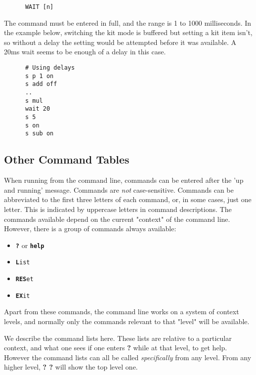    \begin{verbatim}
      WAIT [n]
   \end{verbatim}

   The command must be entered in full, and the range is 1 to 1000 milliseconds.
   In the example below, switching the kit mode is buffered but setting a kit
   item isn't, so without a delay the setting would be attempted before it was
   available. A 20ms wait seems to be enough of a delay in this case.
   \begin{verbatim}
      # Using delays
      s p 1 on
      s add off
      ..
      s mul
      wait 20
      s 5
      s on
      s sub on
   \end{verbatim}

\subsection{Other Command Tables}
\label{subsec:command_line_other_command_tables}

   When running from the command line, commands can be entered after the
   'up and running' message. Commands are \textsl{not} case-sensitive.
   Commands can be abbreviated to the first three letters of each command,
   or, in some cases, just one letter.  This is indicated by
   uppercase letters in command descriptions.
   The commands available depend on the current "context" of the command line.
   However, there is a group of commands always available:

   \begin{itemize}
      \item \texttt{\textbf{?}} or \texttt{\textbf{help}}
      \item \texttt{\textbf{L}ist}
      \item \texttt{\textbf{RES}et}
      \item \texttt{\textbf{EX}it}
   \end{itemize}

   Apart from these commands, the command line works on a system of
   context levels, and normally only the commands relevant to that "level"
   will be available.

   We describe the command lists here. These lists are relative to
   a particular context, and what one sees if one enters
   \textbf{?} while at that level, to get help.
   However the command lists can all be called \textsl{specifically} from any
   level. From any higher level, \textbf{? ?} will show the top level one.

